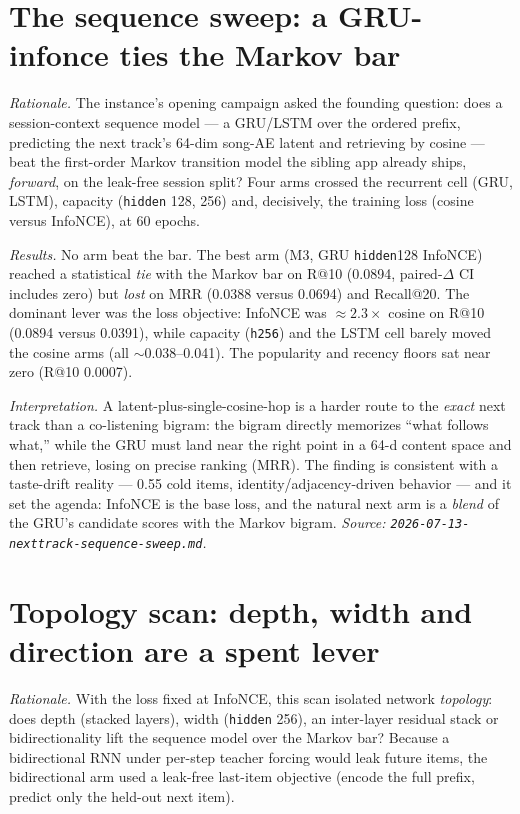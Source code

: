 \documentclass[11pt]{article}
\begin{document}
\section{The sequence sweep: a GRU-infonce ties the Markov bar}
\label{sec:sweep}
\emph{Rationale.} The instance's opening campaign asked the founding question:
does a session-context sequence model --- a GRU/LSTM over the ordered prefix,
predicting the next track's 64-dim song-AE latent and retrieving by cosine ---
beat the first-order Markov transition model the sibling app already ships,
\emph{forward}, on the leak-free session split? Four arms crossed the recurrent
cell (GRU, LSTM), capacity (\texttt{hidden} 128, 256) and, decisively, the
training loss (cosine versus InfoNCE), at 60 epochs.

\emph{Results.} No arm beat the bar. The best arm (M3, GRU \texttt{hidden}128
InfoNCE) reached a statistical \emph{tie} with the Markov bar on R@10
(\num{0.0894}, paired-$\Delta$ CI includes zero) but \emph{lost} on MRR
(\num{0.0388} versus \num{0.0694}) and Recall@20. The dominant lever was the
loss objective: InfoNCE was $\approx 2.3\times$ cosine on R@10 (\num{0.0894}
versus \num{0.0391}), while capacity (\texttt{h256}) and the LSTM cell barely
moved the cosine arms (all $\sim$0.038--0.041). The popularity and recency
floors sat near zero (R@10 \num{0.0007}).

\emph{Interpretation.} A latent-plus-single-cosine-hop is a harder route to the
\emph{exact} next track than a co-listening bigram: the bigram directly
memorizes ``what follows what,'' while the GRU must land near the right point in
a 64-d content space and then retrieve, losing on precise ranking (MRR). The
finding is consistent with a taste-drift reality --- \num{0.55} cold items,
identity/adjacency-driven behavior --- and it set the agenda: InfoNCE is the
base loss, and the natural next arm is a \emph{blend} of the GRU's candidate
scores with the Markov bigram.
\emph{Source: \texttt{2026-07-13-nexttrack-sequence-sweep.md}.}

\section{Topology scan: depth, width and direction are a spent lever}
\label{sec:topology}
\emph{Rationale.} With the loss fixed at InfoNCE, this scan isolated network
\emph{topology}: does depth (stacked layers), width (\texttt{hidden} 256), an
inter-layer residual stack or bidirectionality lift the sequence model over the
Markov bar? Because a bidirectional RNN under per-step teacher forcing would leak
future items, the bidirectional arm used a leak-free last-item objective (encode
the full prefix, predict only the held-out next item).
\end{document}
